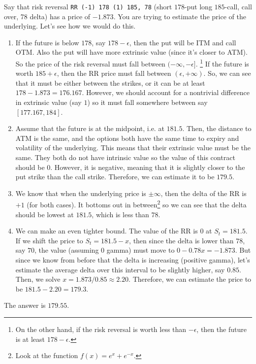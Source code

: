 \documentclass{article}
\begin{document}
    \begin{example}
      \label{ex:estimating-underlying-price-from-risk-reversal}
      Say that risk reversal \texttt{RR (-1) 178 (1) 185, 78} (short $178$-put long $185$-call, call over, 78 delta) has a price of $-1.873$. You are trying to estimate the price of the underlying. Let's see how we would do this.
      \begin{enumerate}
        \item If the future is below $178$, say $178 - \epsilon$, then the put will be ITM and call OTM. Also the put will have more extrinsic value (since it's closer to ATM). So the price of the risk reversal must fall between $(-\infty, -\epsilon]$. \footnote{On the other hand, if the risk reversal is worth less than $-\epsilon$, then the future is at least $178 - \epsilon$. } If the future is worth $185 + \epsilon$, then the RR price must fall between $(\epsilon, +\infty)$. So, we can see that it must be either between the strikes, or it can be at least $178 - 1.873 = 176.167$. However, we should account for a nontrivial difference in extrinsic value (say $1$) so it must fall somewhere between say $[177.167, 184]$.

        \item Assume that the future is at the midpoint, i.e. at $181.5$. Then, the distance to ATM is the same, and the options both have the same time to expiry and volatility of the underlying. This means that their extrinsic value must be the same. They both do not have intrinsic value so the value of this contract should be $0$. However, it is negative, meaning that it is slightly closer to the put strike than the call strike. Therefore, we can estimate it to be $179.5$.

        \item We know that when the underlying price is $\pm \infty$, then the delta of the RR is $+1$ (for both cases). It bottoms out in between\footnote{Look at the function $f(x) = e^{x} + e^{-x}$.} so we can see that the delta should be lowest at $181.5$, which is less than $78$.

        \item We can make an even tighter bound. The value of the RR is $0$ at $S_t = 181.5$. If we shift the price to $S_t = 181.5 - x$, then since the delta is lower than $78$, say $70$, the value (assuming $0$ gamma) must move to $0 - 0.78 x = -1.873$. But since we know from before that the delta is increasing (positive gamma), let's estimate the average delta over this interval to be slightly higher, say $0.85$. Then, we solve $x = 1.873 / 0.85 \approx 2.20$. Therefore, we can estimate the price to be $181.5 - 2.20 = 179.3$.
      \end{enumerate}
      The answer is $179.55$.
    \end{example}
\end{document}
